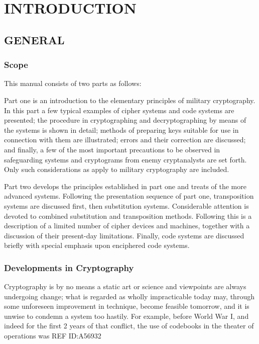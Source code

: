 
\chapter{INTRODUCTION}
 
\section{GENERAL}

\subsection{Scope}

This manual consists of two parts as follows:

\mypara Part one is an introduction to the elementary principles of military
cryptography. In this part a few typical examples of cipher systems and
code systems are presented; the procedure in cryptographing and decryptographing by means of the systems is shown in detail; methods of preparing keys suitable for use in connection with them are illustrated;
errors and their correction are discussed; and ﬁnally, a few of the most
important precautions to be observed in safeguarding systems and
cryptograms from enemy cryptanalysts are set forth. Only such considerations as apply to military cryptography are included.

\mypara Part two develops the principles established in part one and treats
of the more advanced systems. Following the presentation sequence of
part one, transposition systems are discussed ﬁrst, then substitution
systems. Considerable attention is devoted to combined substitution and
transposition methods. Following this is a description of a limited number
of cipher devices and machines, together with a discussion of their
present-day limitations. Finally, code systems are discussed brieﬂy with
special emphasis upon enciphered code systems.

\subsection{Developments in Cryptography}

\mypara Cryptography is by no means a static art or science and viewpoints
are always undergoing change; what is regarded as wholly impracticable
today may, through some unforeseen improvement in technique, become
feasible tomorrow, and it is unwise to condemn a system too hastily.
For example, before World War I, and indeed for the ﬁrst 2 years of
that conﬂict, the use of codebooks in the theater of operations was
REF ID:A56932

